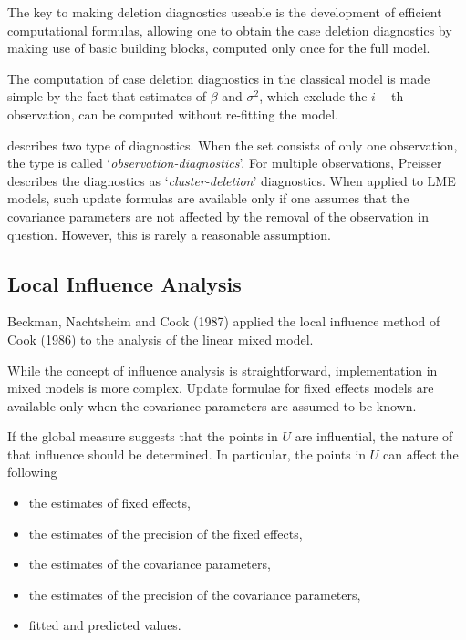 \documentclass[Main.tex]{subfiles}
\begin{document}
The key to making deletion diagnostics useable is the development of efficient computational formulas, allowing one to obtain the  case deletion diagnostics by making use of basic building blocks, computed only once for the full model.

The computation of case deletion diagnostics in the classical model is made simple by the fact that estimates of $\beta$ and $\sigma^2$, which exclude the $i-$th observation, can be computed without re-fitting the model. %

\citet{preisser} describes two type of diagnostics. When the set consists of only one observation, the type is called
`\textit{observation-diagnostics}'. For multiple observations, Preisser describes the diagnostics as `\textit{cluster-deletion}' diagnostics. When applied to LME models, such update formulas are available only if one assumes that the covariance parameters are not affected by the removal of the observation in question. However, this is rarely a reasonable assumption.




\newpage
\subsection{Local Influence Analysis}



Beckman, Nachtsheim and Cook (1987)  applied the local influence method of Cook (1986) to the analysis of the linear mixed model.

While the concept of influence analysis is straightforward, implementation in mixed models is more complex. Update formulae for fixed effects models are available only when the covariance parameters are assumed to be known.

If the global measure suggests that the points in $U$ are influential, the nature of that influence should be determined. In particular, the points in $U$ can affect the following

\begin{itemize}
	\item the estimates of fixed effects,
	\item the estimates of the precision of the fixed effects,
	\item the estimates of the covariance parameters,
	\item the estimates of the precision of the covariance parameters,
	\item fitted and predicted values.
\end{itemize}
\end{document}
